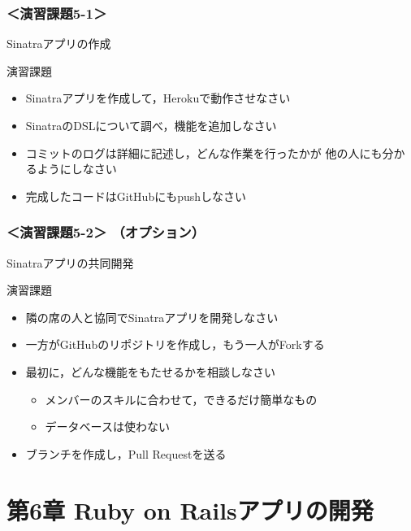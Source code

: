 \documentclass[t, aspectratio=169]{beamer}
\begin{document}
\section{＜演習課題5-1＞}
\label{sec-5-3}
\begin{frame}[label=sec-5-3-1]{Sinatraアプリの作成}
\begin{block}{演習課題}
\begin{itemize}
\item Sinatraアプリを作成して，Herokuで動作させなさい
\item SinatraのDSLについて調べ，機能を追加しなさい
\item コミットのログは詳細に記述し，どんな作業を行ったかが
他の人にも分かるようにしなさい
\item 完成したコードはGitHubにもpushしなさい
\end{itemize}
\end{block}
\end{frame}

\section{＜演習課題5-2＞ （オプション）}
\label{sec-5-4}
\begin{frame}[label=sec-5-4-1]{Sinatraアプリの共同開発}
\begin{block}{演習課題}
\begin{itemize}
\item 隣の席の人と協同でSinatraアプリを開発しなさい
\item 一方がGitHubのリポジトリを作成し，もう一人がForkする
\item 最初に，どんな機能をもたせるかを相談しなさい
\begin{itemize}
\item メンバーのスキルに合わせて，できるだけ簡単なもの
\item データベースは使わない
\end{itemize}
\item ブランチを作成し，Pull Requestを送る
\end{itemize}
\end{block}
\end{frame}
\part{第6章 Ruby on Railsアプリの開発}
\label{sec-6}
\end{document}
